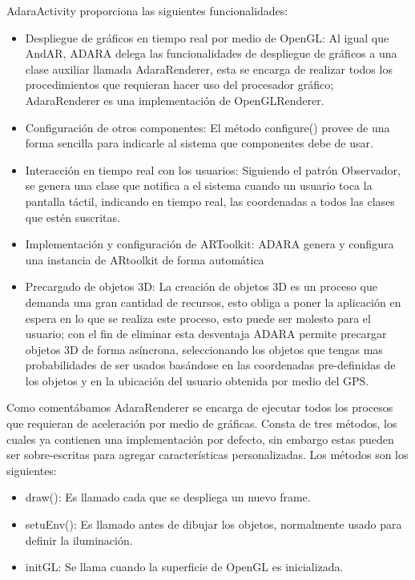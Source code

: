\documentclass[12pt,a4paper,spanish,openany]{book}
\begin{document}
AdaraActivity proporciona las siguientes funcionalidades:
\begin{itemize}
  \item Despliegue de gráficos en tiempo real por medio de OpenGL: Al igual que
  AndAR, ADARA delega las funcionalidades de despliegue de gráficos a una clase
  auxiliar llamada AdaraRenderer, esta se encarga de realizar todos los
  procedimientos que requieran hacer uso del procesador gráfico; AdaraRenderer
  es una implementación de OpenGLRenderer.
  \item Configuración de otros componentes: El método configure() provee de una
  forma sencilla para indicarle al sistema que componentes debe de usar.  
  \item Interacción en tiempo real con los usuarios: Siguiendo el patrón
  Observador, se genera una clase que notifica a el sistema cuando un usuario
  toca la pantalla táctil, indicando en tiempo real, las coordenadas a todos las
  clases que estén suscritas.  
  \item Implementación y configuración de ARToolkit: ADARA  genera y configura
  una instancia de ARtoolkit de forma automática  
  \item Precargado de objetos 3D: La creación de objetos 3D es un proceso que
  demanda una gran cantidad de recursos, esto obliga a poner la aplicación en
  espera en lo que se realiza este proceso, esto puede ser molesto para el
  usuario; con el fin de eliminar esta desventaja ADARA permite precargar
  objetos 3D de forma asíncrona, seleccionando los objetos que tengas mas
  probabilidades de ser usados basándose en las coordenadas pre-definidas de
  los objetos y en la ubicación del usuario obtenida por medio del GPS.
\end{itemize}

Como comentábamos AdaraRenderer se encarga de ejecutar todos los procesos que
requieran de aceleración por medio de gráficas. Consta de tres métodos, los
cuales ya contienen una implementación por defecto, sin embargo estas pueden ser
sobre-escritas para agregar características personalizadas.
Los métodos son los siguientes:
\begin{itemize}
  \item draw(): Es llamado cada que se despliega un nuevo frame.
  \item setuEnv(): Es llamado antes de dibujar los objetos, normalmente usado
  para definir la iluminación.
  \item initGL: Se llama cuando la superficie de OpenGL es inicializada.
\end{itemize}
\end{document}
